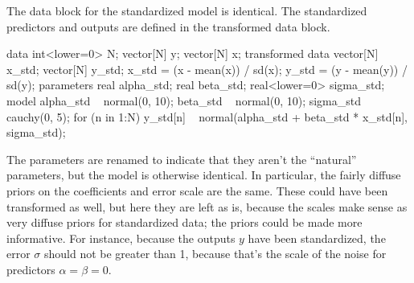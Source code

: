 The data block for the standardized model is identical.  The
standardized predictors and outputs are defined in the transformed
data block.
%
\begin{stancode}
data {
  int<lower=0> N;
  vector[N] y;
  vector[N] x;
}
transformed data {
  vector[N] x_std;
  vector[N] y_std;
  x_std = (x - mean(x)) / sd(x);
  y_std = (y - mean(y)) / sd(y);
}
parameters {
  real alpha_std;
  real beta_std;
  real<lower=0> sigma_std;
}
model {
  alpha_std ~ normal(0, 10);
  beta_std ~ normal(0, 10);
  sigma_std ~ cauchy(0, 5);
  for (n in 1:N)
    y_std[n] ~ normal(alpha_std + beta_std * x_std[n],
                      sigma_std);
}
\end{stancode}
%
The parameters are renamed to indicate that they aren't the
``natural'' parameters, but the model is otherwise identical.  In
particular, the fairly diffuse priors on the coefficients and error
scale are the same.  These could have been transformed as well, but
here they are left as is, because the scales make sense as very
diffuse priors for standardized data; the priors could be made more
informative.  For instance, because the outputs $y$ have been
standardized, the error $\sigma$ should not be greater than 1, because
that's the scale of the noise for predictors $\alpha = \beta = 0$.

